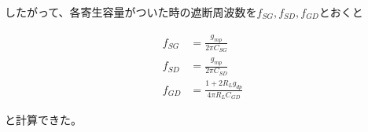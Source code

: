 \documentclass[twocolumn]{jsarticle}
\begin{document}
したがって、各寄生容量がついた時の遮断周波数を$f_{SG},f_{SD},f_{GD}$とおくと

\begin{align}
    f_{SG} &= \frac{g_{mp}}{2\pi C_{SG}}    \label{eq:cutoff_sg}\\
    f_{SD} &= \frac{g_{mp}}{2\pi C_{SD}}    \label{eq:cutoff_sd}\\
    f_{GD} &= \frac{1+2R_{L}g_{dp}}{4\pi R_{L}C_{GD}}      \label{eq:cutoff_gd}
\end{align}

と計算できた。
    
\end{document}
